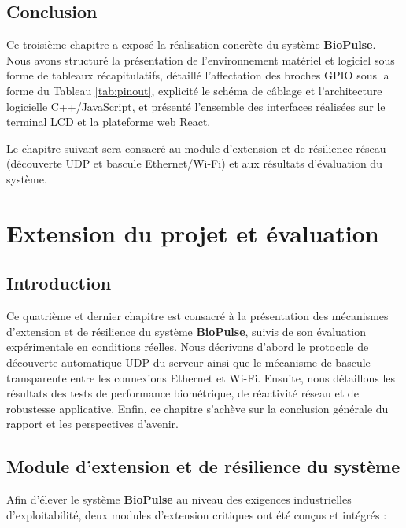 \documentclass[12pt,a4paper]{report}
\begin{document}
\section{Conclusion}
Ce troisième chapitre a exposé la réalisation concrète du système \textbf{BioPulse}. Nous avons structuré la présentation de l'environnement matériel et logiciel sous forme de tableaux récapitulatifs, détaillé l'affectation des broches GPIO sous la forme du Tableau \ref{tab:pinout}, explicité le schéma de câblage et l'architecture logicielle C++/JavaScript, et présenté l'ensemble des interfaces réalisées sur le terminal LCD et la plateforme web React.

Le chapitre suivant sera consacré au module d'extension et de résilience réseau (découverte UDP et bascule Ethernet/Wi-Fi) et aux résultats d'évaluation du système.

\chapter{Extension du projet et évaluation}

\section{Introduction}
Ce quatrième et dernier chapitre est consacré à la présentation des mécanismes d'extension et de résilience du système \textbf{BioPulse}, suivis de son évaluation expérimentale en conditions réelles. Nous décrivons d'abord le protocole de découverte automatique UDP du serveur ainsi que le mécanisme de bascule transparente entre les connexions Ethernet et Wi-Fi. Ensuite, nous détaillons les résultats des tests de performance biométrique, de réactivité réseau et de robustesse applicative. Enfin, ce chapitre s'achève sur la conclusion générale du rapport et les perspectives d'avenir.

\section{Module d'extension et de résilience du système}
Afin d'élever le système \textbf{BioPulse} au niveau des exigences industrielles d'exploitabilité, deux modules d'extension critiques ont été conçus et intégrés :
\end{document}
